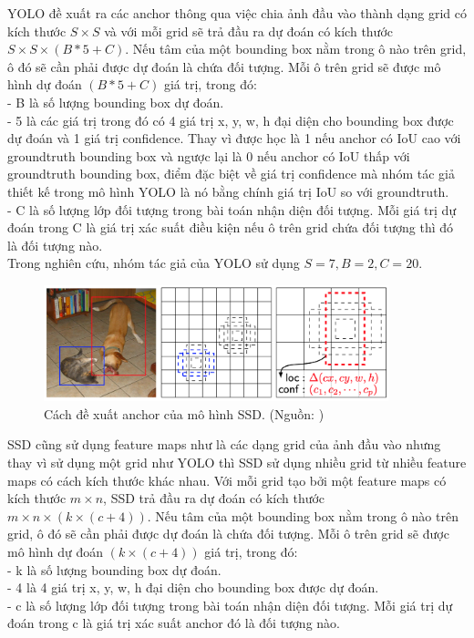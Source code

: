 {    \noindent
    YOLO đề xuất ra các anchor thông qua việc chia ảnh đầu vào thành dạng grid có kích thước $S × S$ và với mỗi grid sẽ trả đầu ra dự đoán có kích thước $S × S × (B * 5 + C)$.
    Nếu tâm của một bounding box nằm trong ô nào trên grid, ô đó sẽ cần phải được dự đoán là chứa đối tượng.
    Mỗi ô trên grid sẽ được mô hình dự đoán $(B * 5 + C)$ giá trị, trong đó: \\
    - B là số lượng bounding box dự đoán. \\
    - 5 là các giá trị trong đó có 4 giá trị x, y, w, h đại diện cho bounding box được dự đoán và 1 giá trị confidence.
    Thay vì được học là 1 nếu anchor có IoU cao với groundtruth bounding box và ngược lại là 0 nếu anchor có IoU thấp với groundtruth bounding box, điểm đặc biệt về giá trị confidence mà nhóm tác giả thiết kế trong mô hình YOLO là nó bằng chính giá trị IoU so với groundtruth. \\
    - C là số lượng lớp đối tượng trong bài toán nhận diện đối tượng.
    Mỗi giá trị dự đoán trong C là giá trị xác suất điều kiện nếu ô trên grid chứa đối tượng thì đó là đối tượng nào. \\
    Trong nghiên cứu, nhóm tác giả của YOLO sử dụng $S = 7, B = 2, C = 20$.

    \begin{figure}[H]
        \centering
        \includegraphics[width=10cm] {images/ssd_anchor}
        \caption{Cách đề xuất anchor của mô hình SSD. (Nguồn: \cite{liu2016ssd})}
        \label{fig:ssd_anchor}
    \end{figure}
    
    \noindent
    SSD cũng sử dụng feature maps như là các dạng grid của ảnh đầu vào nhưng thay vì sử dụng một grid như YOLO thì SSD sử dụng nhiều grid từ nhiều feature maps có cách kích thước khác nhau.
    Với mỗi grid tạo bởi một feature maps có kích thước $m × n$, SSD trả đầu ra dự đoán có kích thước $m × n × (k × (c + 4))$.
    Nếu tâm của một bounding box nằm trong ô nào trên grid, ô đó sẽ cần phải được dự đoán là chứa đối tượng.
    Mỗi ô trên grid sẽ được mô hình dự đoán $(k × (c + 4))$ giá trị, trong đó: \\
    - k là số lượng bounding box dự đoán. \\
    - 4 là 4 giá trị x, y, w, h đại diện cho bounding box được dự đoán. \\
    - c là số lượng lớp đối tượng trong bài toán nhận diện đối tượng.
    Mỗi giá trị dự đoán trong c là giá trị xác suất anchor đó là đối tượng nào.

}
